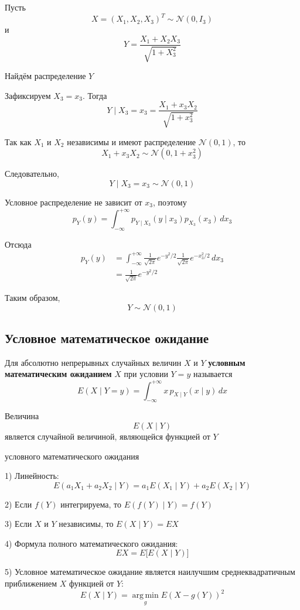 \documentclass[12pt,a4paper]{article}
\begin{document}
\begin{example}

Пусть
\[
X=(X_1,X_2,X_3)^T
\sim
\mathcal{N}(0,I_3)
\]
и
\[
Y
=
\frac{X_1+X_2X_3}{\sqrt{1+X_3^2}}
\]

Найдём распределение $Y$

Зафиксируем $X_3=x_3$. Тогда
\[
Y\mid X_3=x_3
=
\frac{X_1+x_3X_2}{\sqrt{1+x_3^2}}
\]

Так как $X_1$ и $X_2$ независимы и имеют распределение $\mathcal{N}(0,1)$, то
\[
X_1+x_3X_2
\sim
\mathcal{N}(0,1+x_3^2)
\]

Следовательно,
\[
Y\mid X_3=x_3
\sim
\mathcal{N}(0,1)
\]

Условное распределение не зависит от $x_3$, поэтому
\[
p_Y(y)
=
\int_{-\infty}^{+\infty}
p_{Y\mid X_3}(y\mid x_3)p_{X_3}(x_3)\,dx_3
\]

Отсюда
\[
\begin{aligned}
p_Y(y)
&=
\int_{-\infty}^{+\infty}
\frac{1}{\sqrt{2\pi}}e^{-y^2/2}
\frac{1}{\sqrt{2\pi}}e^{-x_3^2/2}\,dx_3\\
&=
\frac{1}{\sqrt{2\pi}}e^{-y^2/2}
\end{aligned}
\]

Таким образом,
\[
Y\sim\mathcal{N}(0,1)
\]

\end{example}

\subsection{Условное математическое ожидание}

\begin{definition}

Для абсолютно непрерывных случайных величин $X$ и $Y$ \textbf{условным математическим ожиданием} $X$ при условии $Y=y$ называется
\[
E(X\mid Y=y)
=
\int_{-\infty}^{+\infty}
x\,p_{X\mid Y}(x\mid y)\,dx
\]

Величина
\[
E(X\mid Y)
\]
является случайной величиной, являющейся функцией от $Y$

\end{definition}

\begin{props}{условного математического ожидания}

1) Линейность:
\[
E(a_1X_1+a_2X_2\mid Y)
=
a_1E(X_1\mid Y)+a_2E(X_2\mid Y)
\]

\medskip

2) Если $f(Y)$ интегрируема, то $E(f(Y)\mid Y)=f(Y)$

\medskip

3) Если $X$ и $Y$ независимы, то $E(X\mid Y)=EX$

\medskip

4) Формула полного математического ожидания:
\[
EX
=
E\bigl[E(X\mid Y)\bigr]
\]

\medskip

5) Условное математическое ожидание является наилучшим среднеквадратичным приближением $X$ функцией от $Y$:
\[
E(X\mid Y)
=
\operatorname*{arg\,min}_{g}
E(X-g(Y))^2
\]

\end{props}
\end{document}

